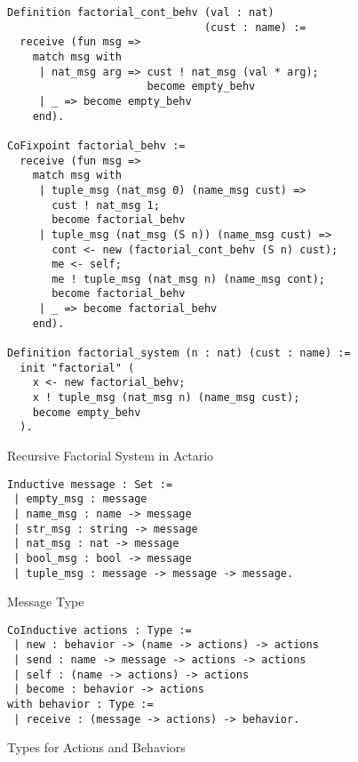 \begin{figure}
\begin{lstlisting}[style=small]
Definition factorial_cont_behv (val : nat)
                               (cust : name) :=
  receive (fun msg =>
    match msg with
     | nat_msg arg => cust ! nat_msg (val * arg);
                      become empty_behv
     | _ => become empty_behv
    end).

CoFixpoint factorial_behv :=
  receive (fun msg =>
    match msg with
     | tuple_msg (nat_msg 0) (name_msg cust) =>
       cust ! nat_msg 1;
       become factorial_behv
     | tuple_msg (nat_msg (S n)) (name_msg cust) =>
       cont <- new (factorial_cont_behv (S n) cust);
       me <- self;
       me ! tuple_msg (nat_msg n) (name_msg cont);
       become factorial_behv
     | _ => become factorial_behv
    end).

Definition factorial_system (n : nat) (cust : name) :=
  init "factorial" (
    x <- new factorial_behv;
    x ! tuple_msg (nat_msg n) (name_msg cust);
    become empty_behv
  ).
\end{lstlisting}
\caption{Recursive Factorial System in Actario}\label{coq:fact}
\end{figure}



\begin{figure}
\begin{lstlisting}
Inductive message : Set :=
 | empty_msg : message
 | name_msg : name -> message
 | str_msg : string -> message
 | nat_msg : nat -> message
 | bool_msg : bool -> message
 | tuple_msg : message -> message -> message.
\end{lstlisting}
\caption{Message Type}\label{coq:message}
\hspace*{1em}
\begin{lstlisting}
CoInductive actions : Type :=
 | new : behavior -> (name -> actions) -> actions
 | send : name -> message -> actions -> actions
 | self : (name -> actions) -> actions
 | become : behavior -> actions
with behavior : Type :=
 | receive : (message -> actions) -> behavior.
\end{lstlisting}
\caption{Types for Actions and Behaviors}\label{coq:actions}
\end{figure}

